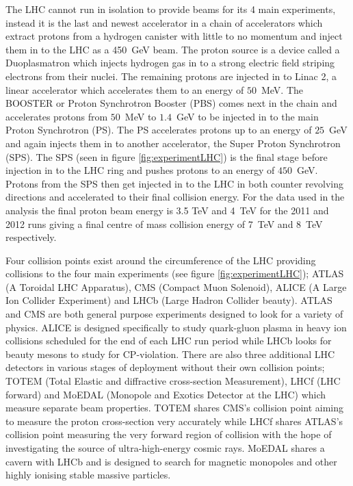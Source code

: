 	The LHC cannot run in isolation to provide beams for its 4 main experiments, instead it is the last and newest accelerator in a chain of accelerators which extract protons from a hydrogen canister with little to no momentum and inject them in to the LHC as a 450~GeV beam.
	The proton source is a device called a Duoplasmatron which injects hydrogen gas in to a strong electric field striping electrons from their nuclei. The remaining protons are injected in to Linac 2, a linear accelerator which accelerates them to an energy of $50$~MeV. The BOOSTER or Proton Synchrotron Booster (PBS) comes next in the chain and accelerates protons from $50$~MeV to $1.4$~GeV to be injected in to the main Proton Synchrotron (PS). The PS accelerates protons up to an energy of $25$~GeV and again injects them in to another accelerator, the Super Proton Synchrotron (SPS). The SPS (seen in figure \ref{fig:experimentLHC}) is the final stage before injection in to the LHC ring and pushes protons to an energy of $450$~GeV. Protons from the SPS then get injected in to the LHC in both counter revolving directions and accelerated to their final collision energy. For the data used in the analysis the final proton beam energy is 3.5 TeV and 4~TeV for the 2011 and 2012 runs giving a final centre of mass collision energy of 7~TeV and 8~TeV respectively.

	Four collision points exist around the circumference of the LHC providing collisions to the four main experiments (see figure \ref{fig:experimentLHC}); ATLAS (A Toroidal LHC Apparatus), CMS (Compact Muon Solenoid), ALICE (A Large Ion Collider Experiment) and LHCb (Large Hadron Collider beauty). ATLAS and CMS are both general purpose experiments designed to look for a variety of physics. ALICE is designed specifically to study quark-gluon plasma in heavy ion collisions scheduled for the end of each LHC run period while LHCb looks for beauty mesons to study for CP-violation.
	There are also three additional LHC detectors in various stages of deployment without their own collision points; TOTEM (Total Elastic and diffractive cross-section Measurement), LHCf (LHC forward) and MoEDAL (Monopole and Exotics Detector at the LHC) which measure separate beam properties. TOTEM shares CMS's collision point aiming to measure the proton cross-section very accurately while LHCf shares ATLAS's collision point measuring the very forward region of collision with the hope of investigating the source of ultra-high-energy cosmic rays. MoEDAL shares a cavern with LHCb and is designed to search for magnetic monopoles and other highly ionising stable massive particles.


